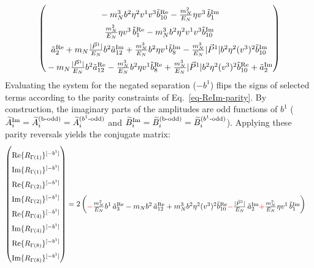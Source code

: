 \begin{widetext}
\begin{align}
\begin{pmatrix}
      \rule{0pt}{16pt} -\mN^3 \bvec^2 \eta^2 v^1 v^3\tilde b^{\text{Re}}_{10}-\frac{\mN^2}{E_N} \eta v^3\, \tilde b^{\text{Im}}_1\\
      \rule{0pt}{16pt} \frac{\mN^2}{E_N} \eta v^3\, \tilde b^{\text{Re}}_1 -\mN^3 \bvec^2 \eta^2 v^1 v^3\tilde b^{\text{Im}}_{10}\\
      \rule{0pt}{16pt}  \tilde a^{\text{Re}}_2 +  \mN  \frac{|\vec{P}^1|}{E_N} \bvec^2  \tilde a^{\text{Im}}_{12}+ \frac{  \mN^3}{E_N}  \bvec^2 \eta v^1  \tilde b^{\text{Im}}_8- \frac{ \mN^3}{E_N}  |\vec{P}^1| \bvec^2 \eta^2 (v^3)^2 \tilde b^{\text{Im}}_{10}\\
      \rule{0pt}{16pt} -  \mN  \frac{|\vec{P}^1|}{E_N} \bvec^2  \tilde a^{\text{Re}}_{12}- \frac{  \mN^3}{E_N}  \bvec^2 \eta v^1  \tilde b^{\text{Re}}_8+ \frac{ \mN^3}{E_N}  |\vec{P}^1| \bvec^2 \eta^2 (v^3)^2 \tilde b^{\text{Re}}_{10}+\tilde a^{\text{Im}}_2
    \end{pmatrix}
\end{align}
Evaluating the system for the negated separation ($-b^1$) flips the signs of selected terms according to the parity constraints of Eq.~\eqref{eq-ReIm-parity}. By construction, the imaginary parts of the amplitudes are odd functions of $b^1$ ($\widetilde{A}_i^{\text{Im}}=\widetilde{A}_i^{\text{(b-odd)}}=\widetilde{A}_i^{\text{($b^1$-odd)}}$ and  $\widetilde{B}_i^{\text{Im}}=\widetilde{B}_i^{\text{(b-odd)}}=\widetilde{B}_i^{\text{($b^1$-odd)}}$). Applying these parity reversals yields the conjugate matrix:
\begin{align}
    \begin{pmatrix}
        \rule{0pt}{16pt} \text{Re}\{ R_{\Gamma(1)}\}^{[-b^1]} \\
        \rule{0pt}{16pt} \text{Im}\{ R_{\Gamma(1)}\}^{[-b^1]} \\
        \rule{0pt}{16pt} \text{Re}\{ R_{\Gamma(2)}\}^{[-b^1]} \\
        \rule{0pt}{16pt} \text{Im}\{ R_{\Gamma(2)}\}^{[-b^1]} \\
        \rule{0pt}{16pt} \text{Re}\{ R_{\Gamma(4)}\}^{[-b^1]} \\
        \rule{0pt}{16pt} \text{Im}\{ R_{\Gamma(4)}\}^{[-b^1]} \\
        \rule{0pt}{16pt} \text{Re}\{ R_{\Gamma(8)}\}^{[-b^1]} \\
        \rule{0pt}{16pt} \text{Im}\{ R_{\Gamma(8)}\}^{[-b^1]}
    \end{pmatrix} &= 2\begin{pmatrix}
     \rule{0pt}{16pt}   \textcolor{red}{-}\frac{\mN^2}{E_N} \bvec^1\, \tilde a^{\text{Re}}_3-  \mN  \bvec^2 \, \tilde a^{\text{Re}}_{12}+  \mN^3  \bvec^2 \eta^2 (v^3)^2 \tilde b^{\text{Re}}_{10} \textcolor{red}{-}\frac{|\vec{P}^1|}{E_N}\, \tilde a^{\text{Im}}_2\textcolor{red}{+} \frac{\mN^2}{E_N} \eta v^1\, \tilde b^{\text{Im}}_1\\

\end{pmatrix}
\end{align}
\end{widetext}
